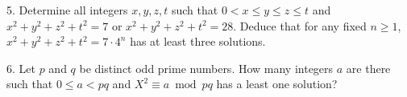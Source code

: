 \item{5.} Determine all integers $x,y,z,t$ such that $0<x\le y\le z\le t$ and  $x^2+y^2+z^2+t^2=7$
or $x^2+y^2+z^2+t^2=28$. Deduce that for any fixed $n\ge1$, $x^2+y^2+z^2+t^2=7\cdot 4^n$ has at least three solutions.\ve \vs

\item{6.} Let $p$ and $q$ be distinct odd prime numbers. How many integers $a$ are there such that $0\le a< pq$ and $X^2\equiv a\bmod pq$ has a least
one solution?
\ \vst\bye
